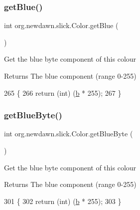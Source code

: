 \subsubsection{\texorpdfstring{get\+Blue()}{getBlue()}}
{\footnotesize\ttfamily int org.\+newdawn.\+slick.\+Color.\+get\+Blue (\begin{DoxyParamCaption}{ }\end{DoxyParamCaption})\hspace{0.3cm}{\ttfamily [inline]}}

Get the blue byte component of this colour

\begin{DoxyReturn}{Returns}
The blue component (range 0-\/255) 
\end{DoxyReturn}

\begin{DoxyCode}
265                          \{
266         \textcolor{keywordflow}{return} (\textcolor{keywordtype}{int}) (\mbox{\hyperlink{classorg_1_1newdawn_1_1slick_1_1_color_a8c0cef152e16438fee852a97e50ef7a5}{b}} * 255);
267     \}
\end{DoxyCode}
\mbox{\label{classorg_1_1newdawn_1_1slick_1_1_color_aaf9bf5fc9f16893ba52c4bc82f27069b}} 
\subsubsection{\texorpdfstring{get\+Blue\+Byte()}{getBlueByte()}}
{\footnotesize\ttfamily int org.\+newdawn.\+slick.\+Color.\+get\+Blue\+Byte (\begin{DoxyParamCaption}{ }\end{DoxyParamCaption})\hspace{0.3cm}{\ttfamily [inline]}}

Get the blue byte component of this colour

\begin{DoxyReturn}{Returns}
The blue component (range 0-\/255) 
\end{DoxyReturn}

\begin{DoxyCode}
301                              \{
302         \textcolor{keywordflow}{return} (\textcolor{keywordtype}{int}) (\mbox{\hyperlink{classorg_1_1newdawn_1_1slick_1_1_color_a8c0cef152e16438fee852a97e50ef7a5}{b}} * 255);
303     \}
\end{DoxyCode}
\mbox{\label{classorg_1_1newdawn_1_1slick_1_1_color_a0fceed1c8e8cf29062db08d02515884d}} 
